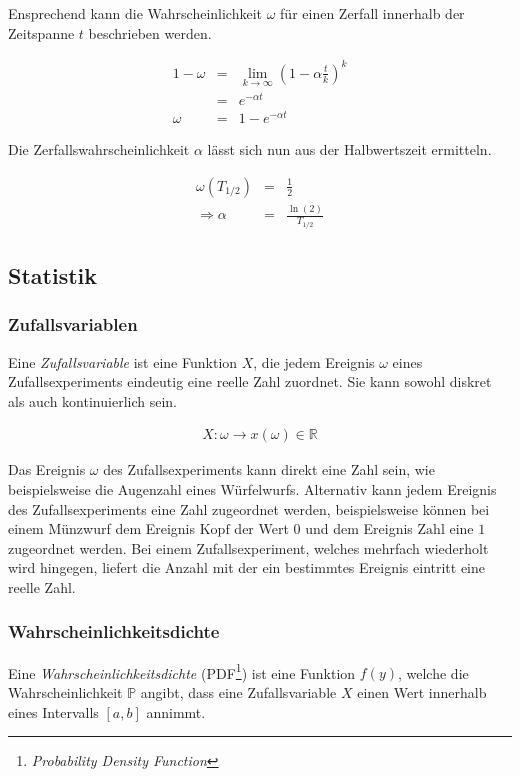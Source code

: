 \documentclass[12pt,a4paper]{scrartcl}
\numberwithin{equation}{section} %
\begin{document}
Ensprechend kann die Wahrscheinlichkeit $\omega$ für einen Zerfall innerhalb der Zeitspanne $t$ beschrieben werden.

\begin{eqnarray}
	1 - \omega &=& \lim_{k \rightarrow \infty} \left(1 - \alpha \frac{t}{k} \right)^k \\
		&=& e^{- \alpha t} \\
	\omega &=& 1 - e^{-\alpha t}
\end{eqnarray}

\noindent
Die Zerfallswahrscheinlichkeit $\alpha$ lässt sich nun aus der Halbwertszeit ermitteln.

\begin{eqnarray}
	\omega(T_{1/2}) &=& \frac{1}{2} \\
	\Rightarrow\alpha &=& \frac{\ln{(2)}}{T_{1/2}}
\end{eqnarray}

\hypertarget{statistik}{\subsection{Statistik}\label{statistik}}

\subsubsection{Zufallsvariablen}
\label{Zufallsvariablen}
Eine \emph{Zufallsvariable} ist eine Funktion $X$, die jedem Ereignis $\omega$ eines Zufallsexperiments eindeutig eine reelle Zahl zuordnet. Sie kann sowohl diskret als auch kontinuierlich sein.

\begin{eqnarray}
	X : \omega \rightarrow x(\omega) \in \mathbb{R}
\end{eqnarray}

\noindent
Das Ereignis $\omega$ des Zufallsexperiments kann direkt eine Zahl sein, wie beispielsweise die Augenzahl eines Würfelwurfs. Alternativ kann jedem Ereignis des Zufallsexperiments eine Zahl zugeordnet werden, beispielsweise können bei einem Münzwurf dem Ereignis $\mathrm{Kopf}$ der Wert $0$ und dem Ereignis $\mathrm{Zahl}$ eine $1$ zugeordnet werden. Bei einem Zufallsexperiment, welches mehrfach wiederholt wird hingegen, liefert die Anzahl mit der ein bestimmtes Ereignis eintritt eine reelle Zahl.


\subsubsection{Wahrscheinlichkeitsdichte}
\label{Wahrscheinlichkeitsdichte}
Eine \textit{Wahrscheinlichkeitsdichte} (PDF\footnote{\emph{Probability Density Function}}) ist eine Funktion $f(y)$, welche die Wahrscheinlichkeit $\mathbb P$ angibt, dass eine Zufallsvariable $X$ einen Wert innerhalb eines Intervalls $[a,b]$ annimmt.
\end{document}
